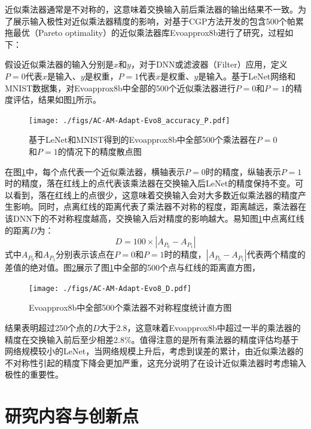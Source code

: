 近似乘法器通常是不对称的，这意味着交换输入前后乘法器的输出结果不一致。为了展示输入极性对近似乘法器精度的影响，对基于CGP方法开发的包含500个帕累拖最优（Pareto optimality）的近似乘法器库Evoapprox8b\cite{AC:AM:CGP_Evoapprox8b}进行了研究，过程如下：

假设近似乘法器的输入分别是$x$和$y$，对于DNN或滤波器（Filter）应用，定义$P=0$代表$x$是输入、$y$是权重，$P=1$代表$x$是权重、$y$是输入。基于LeNet网络和MNIST数据集\cite{DNN:LeNet_MNIST}，对Evoapprox8b\cite{AC:AM:CGP_Evoapprox8b}中全部的500个近似乘法器进行$P=0$和$P=1$的精度评估，结果如图\ref{AC:AM:Adapt:Fig:Evo8_accuracy_P}所示。
\begin{figure}[!htb]
    \centering
    \texttt{[image: ./figs/AC-AM-Adapt-Evo8\_accuracy\_P.pdf]}
    \caption{基于LeNet和MNIST得到的Evoapprox8b中全部500个乘法器在$P=0$和$P=1$的情况下的精度散点图}
    \label{AC:AM:Adapt:Fig:Evo8_accuracy_P}
\end{figure}
在图\ref{AC:AM:Adapt:Fig:Evo8_accuracy_P}中，每个点代表一个近似乘法器，横轴表示$P=0$时的精度，纵轴表示$P=1$时的精度，落在红线上的点代表该乘法器在交换输入后LeNet的精度保持不变。可以看到，落在红线上的点很少，这意味着交换输入会对大多数近似乘法器的精度产生影响。同时，点离红线的距离代表了乘法器不对称的程度，距离越远，乘法器在该DNN下的不对称程度越高，交换输入后对精度的影响越大。易知图\ref{AC:AM:Adapt:Fig:Evo8_accuracy_P}中点离红线的距离$D$为：
\begin{equation}
    \label{AC:AM:Adapt:Eq:Evo8_D}
      D =  100 \times | A_{P_0} - A_{P_1} |
\end{equation} 
式中$A_{P_0}$和$A_{P_1}$分别表示该点在$P=0$和$P=1$时的精度，$| A_{P_0} - A_{P_1} |$代表两个精度的差值的绝对值。图\ref{AC:AM:Adapt:Fig:Evo8_D}展示了图\ref{AC:AM:Adapt:Fig:Evo8_accuracy_P}中全部的500个点与红线的距离直方图，
\begin{figure}[!ht]
    \centering
    \texttt{[image: ./figs/AC-AM-Adapt-Evo8\_D.pdf]}
    \caption{Evoapprox8b中全部500个乘法器不对称程度统计直方图}
    \label{AC:AM:Adapt:Fig:Evo8_D}
\end{figure}
结果表明超过250个点的$D$大于2.8，这意味着Evoapprox8b\cite{AC:AM:CGP_Evoapprox8b}中超过一半的乘法器的精度在交换输入前后至少相差2.8\%。值得注意的是所有乘法器的精度评估均基于网络规模较小的LeNet，当网络规模上升后，考虑到误差的累计，由近似乘法器的不对称性引起的精度下降会更加严重，这充分说明了在设计近似乘法器时考虑输入极性的重要性。

\section{研究内容与创新点}

